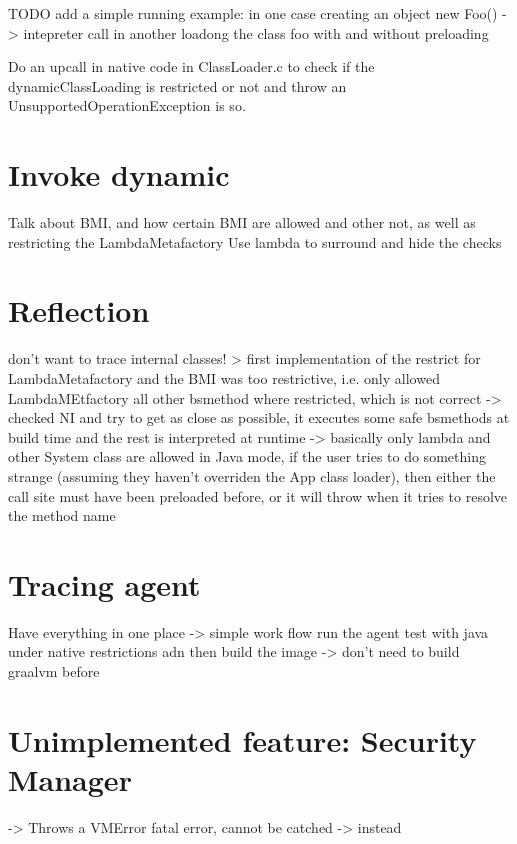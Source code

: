 TODO add a simple running example: in one case creating an object new Foo() -> intepreter call
in another loadong the class foo with and without preloading

Do an upcall in native code in ClassLoader.c to check if the dynamicClassLoading is restricted or not and throw an UnsupportedOperationException is so.

\section{Invoke dynamic}
Talk about BMI, and how certain BMI are allowed and other not, as well as restricting the LambdaMetafactory
Use lambda to surround and hide the checks

\section{Reflection}
don't want to trace internal classes!
> first implementation of the restrict for LambdaMetafactory and the BMI was too restrictive,
i.e. only allowed LambdaMEtfactory all other bsmethod where restricted, which is not correct ->
checked NI and try to get as close as possible, it executes some safe bsmethods at build time and
the rest is interpreted at runtime -> basically only lambda and other System class are allowed in
Java mode, if the user tries to do something strange (assuming they haven’t overriden the App class
loader), then either the call site must have been preloaded before, or it will throw when it tries to
resolve the method name

\section{Tracing agent}

Have everything in one place -> simple work flow run the agent test with java under native restrictions adn then build the image -> don't need to build graalvm before

\section{Unimplemented feature: Security Manager}
-> Throws a VMError fatal error, cannot be catched
-> instead

